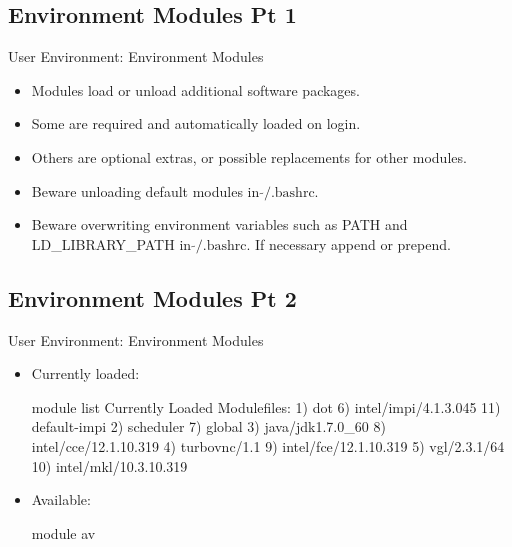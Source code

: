 \subsection{Environment Modules Pt 1}
\begin{frame}[fragile]{User Environment: Environment Modules}
\begin{itemize}
\item{Modules load or unload additional software packages.}
\item{Some are \alert{required} and automatically loaded on login.}
\item{Others are optional extras, or possible replacements for other modules.}
\item{\alert{Beware} unloading default modules in $\tilde{}\text{/.bashrc}$.}
\item{\alert{Beware} overwriting environment variables such as PATH and LD\_LIBRARY\_PATH in $\tilde{}\text{/.bashrc}$. If necessary append or prepend.}
\end{itemize}
\end{frame}

\subsection{Environment Modules Pt 2}
\begin{frame}[fragile]{User Environment: Environment Modules}
\begin{itemize}
\item{Currently loaded:}
\begin{semiverbatim}
\scriptsize
module list
Currently Loaded Modulefiles:
  1) dot                     6) intel/impi/4.1.3.045   11) default-impi
  2) scheduler               7) global                 
  3) java/jdk1.7.0_60        8) intel/cce/12.1.10.319  
  4) turbovnc/1.1            9) intel/fce/12.1.10.319  
  5) vgl/2.3.1/64           10) intel/mkl/10.3.10.319
\end{semiverbatim}
\medskip
\item{Available:}
\begin{semiverbatim}
\scriptsize
module av
\end{semiverbatim}
\end{itemize}
\end{frame}

